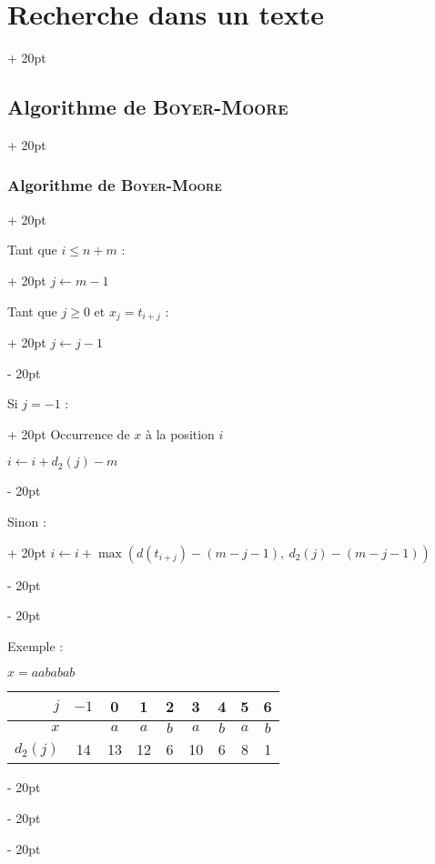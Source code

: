 \documentclass[a4paper, 12pt, twoside]{article}
\newcommand{\lr}[1]{\left( #1 \right)}
\renewcommand{\le}{\leqslant}
\renewcommand{\ge}{\geqslant}
\newcommand{\ind}[1][20pt]{\advance\leftskip + #1}
\newcommand{\deind}[1][20pt]{\advance\leftskip - #1}
\newenvironment{indt}[2][20pt]{#2 \par \ind[#1]}{\par \deind} %
\begin{document}
\begin{indt}{\section{Recherche dans un texte}}
\begin{indt}{\subsection{Algorithme de \textsc{Boyer-Moore}}}
\begin{indt}{\subsubsection{Algorithme de \textsc{Boyer-Moore}}}
\begin{pseudocode}
                    \begin{indt}{Tant que $i \le n + m$ :}
                        $j \leftarrow m - 1$
                        
                        \vspace{6pt}
                        
                        \begin{indt}{Tant que $j \ge 0$ et $x_j = t_{i + j}$ :}
                            $j \leftarrow j - 1$
                        \end{indt}
                        
                        \vspace{6pt}
                        
                        \begin{indt}{Si $j = -1$ :}
                            Occurrence de $x$ à la position $i$
                            
                            $i \leftarrow i + d_2(j) - m$
                        \end{indt}
                        
                        \vspace{6pt}
                        
                        \begin{indt}{Sinon :}
                            $i \leftarrow i + \max\!\lr{d(t_{i + j}) - (m - j - 1),\ d_2(j) - (m - j - 1)}$
                        \end{indt}
                    \end{indt}
                \end{pseudocode}

                \vspace{12pt}
                
                Exemple :

                \vspace{6pt}
                
                $x = aababab$

                \vspace{6pt}
                
                \begin{tabular}{r|cccccccc}
                    $j$ & $-1$ & 0 & 1 & 2 & 3 & 4 & 5 & 6
                    \\
                    \hline
                    $x$ & & $a$ & $a$ & $b$ & $a$ & $b$ & $a$ & $b$
                    \\
                    \hline
                    $d_2(j)$ & 14 & 13 & 12 & 6 & 10 & 6 & 8 & 1
                \end{tabular}


\end{indt}
\end{indt}
\end{indt}
\end{document}
